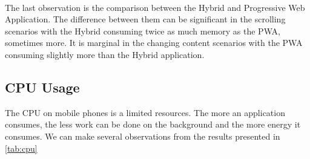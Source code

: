 \documentclass{kththesis}
\begin{document}
\paragraph{}
The last observation is the comparison between the Hybrid and Progressive Web Application. The difference between them can be significant in the scrolling scenarios with the Hybrid consuming twice as much memory as the PWA, sometimes more. It is marginal in the changing content scenarios with the PWA consuming slightly more than the Hybrid application. 

\subsection{CPU Usage}

The CPU on mobile phones is a limited resources. The more an application consumes, the less work can be done on the background and the more energy it consumes. We can make several observations from the results presented in \autoref{tab:cpu}  
\end{document}
